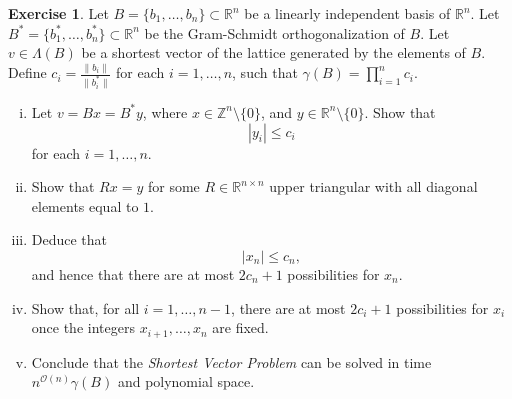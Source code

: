 \documentclass[12pt,a4paper]{article}
\theoremstyle{plain}
\newtheorem*{Sol*}{Solution}
\theoremstyle{definition}
\newtheorem{Ex}{Exercise}
\def \R {\mathbb R}
\def \Z {\mathbb Z}
\newif\ifsolutions
\newcommand{\exercise}[2]{
			\begin{Ex} #1 \end{Ex}
			\ifsolutions  \begin{Sol*} #2 \end{Sol*} \bigskip \else \bigskip  \fi
		}
\begin{document}
\exercise{
	Let $B = \{b_1,\dots,b_n\} \subset \R^n$ be a linearly independent basis of $\R^n$. 
	Let $B^* = \{b_1^*,\dots,b_n^*\} \subset \R^n$ be the Gram-Schmidt orthogonalization of $B$.
	Let $v \in \Lambda(B)$ be a shortest vector of the lattice generated by the elements of $B$.
	Define $c_i =  \frac{\| b_i \|}{\| b_i^* \|}$ for each $i = 1, \dots, n$, such that $\gamma(B) = \prod_{i=1}^n c_i$.
	\begin{enumerate}[i)]
		\item Let $v = Bx = B^*y$, where $x \in \Z^{n} \setminus \{0\}$, and $y \in \R^{n} \setminus \{0\}$.
		Show that
			\[ | y_i | \leq c_i \]
		for each $i=1, \dots, n$.
		\item Show that $ Rx = y$ for some $R \in \R^{n \times n}$ upper triangular with all diagonal elements equal to $1$.
		\item Deduce that 
			\[ | x_n | \leq c_n, \]
		and hence that there are at most $2c_n + 1$ possibilities for $x_n$.
		\item Show that, for all $i=1, \dots, n-1$, there are at most $2 c_i + 1$ possibilities for $x_i$ once the integers $x_{i+1}, \dots, x_n$ are fixed.
		\item Conclude that the \emph{Shortest Vector Problem} can be solved in time $n^{\mathcal{O}(n)} \gamma(B)$ and polynomial space.
	\end{enumerate}
}
{

	\begin{enumerate}[i)]
		\item The coordinates $y$ of $v$ in the orthogonal basis $B^*$ are given by
			\[ y_i = \frac{\langle v, b_i^* \rangle}{\langle b_i^*, b_i^* \rangle} \quad \text{ for each $i$}. \]
		The Cauchy-Schwarz inequality gives
			\[ | y_i | \leq \frac{\| v \|}{\| b_i^* \|} \leq c_i, \]
		as $v$ is a shortest vector.
		
		\item The matrix $R$ given by the Gram-Schmidt orthogonalization verifies $B = B^* R$, and hence gives $Rx = y.$

		\item The relation $Rx = y$ gives $x_n = y_n$, since $R$ is upper triangular with diagonal $1$.
		
		\item Fixing the integers $x_{i+1}, \dots, x_n$, the relation $Rx = y$ implies that 
			\[ x_i = y_i + F, \]
		where $F$ is some fixed quantity.
		The bound $| y_i | \leq c_i$ implies that $F - c_i \leq x_i \leq c_i + F$, which gives $2c_i + 1$ candidates for $x_i$.

		\item We enumerate the coordinates $x$ of a shortest vector from $x_n$ to $x_1$.
		 Note however that computing the lowerbound for the interval $x_i$ belongs to depending on $x_{i+1}, \dots, x_n$ takes linear time once the inverse $R^{-1}$ is computed (replacing $y$ by $-c$).

		Computing the image of each coordinate also takes linear time at each step, since we only modify one coordinate at a time. Accounting also for linear comparison, we get a runtime of order $\prod_{i=1}^n n (2c_i +1) \leq n^{\mathcal{O}(n)} \gamma(B)$.
		
	\end{enumerate}


}
\end{document}
